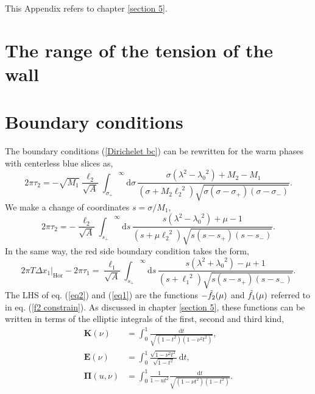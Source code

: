 This Appendix refers to chapter \ref{section 5}.

\section{The range of the tension of the wall}


\section{Boundary conditions}

The boundary conditions (\ref{Dirichelet bc}) can be rewritten for the warm phases with centerless blue slices as,
\begin{equation}
    2\pi\tau_2 = -\sqrt{M_1}\frac{\ell_2}{\sqrt{A}} {\int_{\sigma_+}}^\infty \text{d}\sigma\, \frac{\sigma\left(\lambda^2-{\lambda_0}^2\right)+M_2-M_1}{\left(\sigma+M_2{\ell_2}^2\right)\sqrt{\sigma\left(\sigma-\sigma_+\right)\left(\sigma-\sigma_-\right)}}.
\end{equation}
We make a change of coordinates $s = \sigma/M_1$,
\begin{equation}\label{eq2}
    2\pi\tau_2 = -\frac{\ell_2}{\sqrt{A}} {\int_{s_+}}^\infty \text{d}s\, \frac{s\left(\lambda^2-{\lambda_0}^2\right)+\mu-1}{\left(s+\mu{\ell_2}^2\right)\sqrt{s\left(s-s_+\right)\left(s-s_-\right)}}.
\end{equation}
In the same way, the red side boundary condition takes the form,
\begin{equation}\label{eq1}
    2\pi T\Delta x_1\big|_\text{Hor}-2\pi\tau_1 = \frac{\ell_1}{\sqrt{A}} {\int_{s_+}}^\infty \text{d}s\, \frac{s\left(\lambda^2+{\lambda_0}^2\right)-\mu+1}{\left(s+{\ell_1}^2\right)\sqrt{s\left(s-s_+\right)\left(s-s_-\right)}}.
\end{equation}
The LHS of eq. (\ref{eq2}) and (\ref{eq1}) are the functions $-\Tilde{f}_2(\mu)$ and $\Tilde{f}_1(\mu)$ referred to in eq. (\ref{f2 constrain}). As discussed in chapter \ref{section 5}, these functions can be written in terms of the elliptic integrals of the first, second and third kind,
\begin{align}
    \bm{K}(\nu) &= \int_{0}^{1} \frac{\mathrm{d}t}{\sqrt{\left(1 - t^2\right)\left(1 - \nu^2 t^2\right)}},\\
    \bm{E}(\nu) &= \int_0^1 \frac{\sqrt{1-\nu^2 t^2} }{\sqrt{1-t^2}}\,\mathrm{d}t,\\
    \bm{\Pi}(u,\nu) &= \int_{0}^{1} \frac{1}{1-ut^2} \frac{\mathrm{d}t}{\sqrt{\left(1-\nu t^2\right)\left(1-t^2\right)}}.
\end{align}

